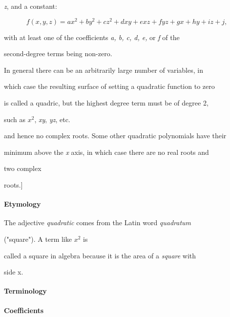 \textit{z}, and a constant:



$$f(x,y,z)=ax^2+by^2+cz^2+dxy+exz+fyz+gx+hy+iz +j,$$



with at least one of the coefficients \textit{a, b, c, d, e,} or \textit{f} of the

second-degree terms being non-zero.



In general there can be an arbitrarily large number of variables, in

which case the resulting surface of setting a quadratic function to zero

is called a quadric, but the highest degree term must be of degree 2,

such as \textit{$x^2$}, \textit{xy}, \textit{yz}, etc.




and hence no complex roots. Some other quadratic polynomials have their

minimum above the \textit{x} axis, in which case there are no real roots and

two complex

roots.]



\paragraph{Etymology}



The adjective \textit{quadratic} comes from the Latin word \textit{quadratum}

("square"). A term like \textit{$x^2$} is

called a square in algebra because it is the area of a \textit{square} with

side x.



\paragraph{Terminology}



\paragraph{Coefficients}



